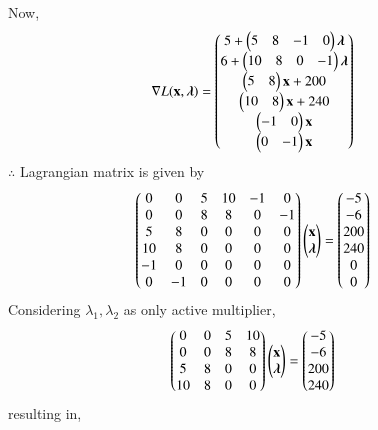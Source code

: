 Now,
\begin{align}
    \nabla L(\mathbf{x},\boldsymbol{\lambda}) &= \begin{pmatrix}5+ \begin{pmatrix}5 & 8 & -1 & 0 \end{pmatrix}\boldsymbol{\lambda}\\ 6+\begin{pmatrix}10 & 8 & 0 & -1\end{pmatrix}\boldsymbol{\lambda} \\ \begin{pmatrix}5 & 8\end{pmatrix}\mathbf{x}+200 \\ \begin{pmatrix}10 & 8\end{pmatrix}\mathbf{x}+240 \\ \begin{pmatrix}-1 & 0\end{pmatrix}\mathbf{x} \\ \begin{pmatrix}0 & -1\end{pmatrix}\mathbf{x}\end{pmatrix}
\end{align}
$\therefore$ Lagrangian matrix is given by
\begin{align}
    \begin{pmatrix}0 & 0 & 5 & 10 & -1 & 0 \\ 0 & 0 & 8 & 8 & 0 & -1 \\ 5 & 8 & 0 & 0 & 0 & 0  \\ 10 & 8 & 0 & 0 & 0 & 0  \\ -1 & 0 & 0 & 0 & 0 & 0  \\ 0 & -1 & 0 & 0 & 0 & 0 \end{pmatrix}\begin{pmatrix}\mathbf{x} \\ \boldsymbol{\lambda} \end{pmatrix} &= \begin{pmatrix}-5 \\ -6 \\ 200 \\ 240 \\ 0 \\0 \end{pmatrix}
\end{align}
Considering $\lambda_1,\lambda_2$ as only active multiplier,
\begin{align}
    \begin{pmatrix}0 & 0 & 5 & 10 \\ 0 & 0 & 8 & 8 \\ 5 & 8 & 0 & 0 \\ 10 & 8 & 0 & 0\end{pmatrix}\begin{pmatrix}\mathbf{x}\\ \boldsymbol{\lambda}\end{pmatrix} &=\begin{pmatrix}-5 \\ -6 \\ 200 \\ 240\end{pmatrix}
\end{align}
resulting in,
